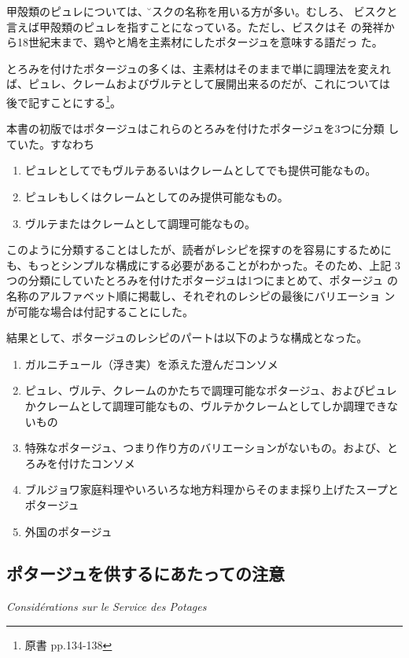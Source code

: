 甲殻類のピュレについては、\u{ビスク}の名称を用いる方が多い。むしろ、
ビスクと言えば甲殻類のピュレを指すことになっている。ただし、ビスクはそ
の発祥から18世紀末まで、鶏やと鳩を主素材にしたポタージュを意味する語だっ
た。

とろみを付けたポタージュの多くは、主素材はそのままで単に調理法を変えれ
ば、ピュレ、クレームおよびヴルテとして展開出来るのだが、これについては
後で記すことにする\footnote{原書 pp.134-138}。

本書の初版ではポタージュはこれらのとろみを付けたポタージュを3つに分類
していた。すなわち

\begin{enumerate}
\def\labelenumi{\arabic{enumi}.}
\item
  ピュレとしてでもヴルテあるいはクレームとしてでも提供可能なもの。
\item
  ピュレもしくはクレームとしてのみ提供可能なもの。
\item
  ヴルテまたはクレームとして調理可能なもの。
\end{enumerate}

このように分類することはしたが、読者がレシピを探すのを容易にするために
も、もっとシンプルな構成にする必要があることがわかった。そのため、上記
3つの分類にしていたとろみを付けたポタージュは1つにまとめて、ポタージュ
の名称のアルファベット順に掲載し、それぞれのレシピの最後にバリエーショ
ンが可能な場合は付記することにした。

結果として、ポタージュのレシピのパートは以下のような構成となった。

\begin{enumerate}
\def\labelenumi{\arabic{enumi}.}
\item
  ガルニチュール（浮き実）を添えた澄んだコンソメ
\item
  ピュレ、ヴルテ、クレームのかたちで調理可能なポタージュ、およびピュレかクレームとして調理可能なもの、ヴルテかクレームとしてしか調理できないもの
\item
  特殊なポタージュ、つまり作り方のバリエーションがないもの。および、とろみを付けたコンソメ
\item
  ブルジョワ家庭料理やいろいろな地方料理からそのまま採り上げたスープとポタージュ
\item
  外国のポタージュ
\end{enumerate}

\hypertarget{consideration-sur-le-service-des-potages}{%
\subsection{ポタージュを供するにあたっての注意}\label{consideration-sur-le-service-des-potages}}

\vspace{-1\zw} \begin{center}
\hspace{1\zw}\large\textit{Considérations sur le Service des Potages}
\normalsize \end{center}
